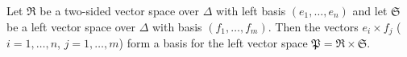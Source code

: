 Let $\mathfrak{R}$ be a two-sided vector space over $\Delta$ with left basis $(e_1, \dots, e_n)$ and let $\mathfrak{S}$ be a left vector space over $\Delta$ with basis $(f_1, \dots, f_m)$. Then the vectors $e_i \times f_j$ ($i = 1,\dots,n$, $j = 1,\dots,m$) form a basis for the left vector space $\mathfrak{P} = \mathfrak{R} \times \mathfrak{S}$.
